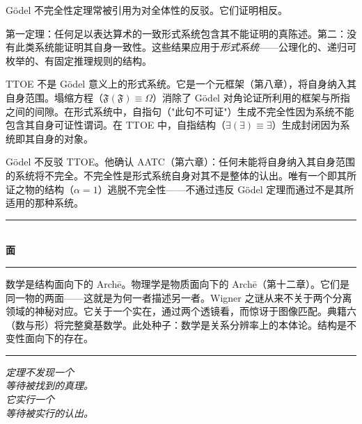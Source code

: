 \documentclass[10pt, openany, oneside]{book}
\renewcommand{\normalsize}{\fontsize{10}{13}\selectfont}
\begin{document}
\vspace{1em}

\noindent G\"{o}del 不完全性定理常被引用为对全体性的反驳。它们证明相反。

第一定理：任何足以表达算术的一致形式系统包含其不能证明的真陈述。第二：没有此类系统能证明其自身一致性。这些结果应用于\textit{形式系统}——公理化的、递归可枚举的、有固定推理规则的结构。

TTOE 不是 G\"{o}del 意义上的形式系统。它是一个元框架（第八章），将自身纳入其自身范围。塌缩方程（$\mathfrak{F}(\mathfrak{F}) \equiv \Omega$）消除了 G\"{o}del 对角论证所利用的框架与所指之间的间隙。在形式系统中，自指句（"此句不可证"）生成不完全性因为系统不能包含其自身可证性谓词。在 TTOE 中，自指结构（$\exists(\exists) \equiv \exists$）生成封闭因为系统即其自身的对象。

G\"{o}del 不反驳 TTOE。他确认 AATC（第六章）：任何未能将自身纳入其自身范围的系统将不完全。不完全性是形式系统自身对其不是整体的认出。唯有一个即其所证之物的结构（$\alpha = 1$）逃脱不完全性——不通过违反 G\"{o}del 定理而通过不是其所适用的那种系统。

\vspace{1.5em}


\begin{center}
    \rule{0.3\textwidth}{0.4pt}\\[0.5em]
    {\normalsize\bfseries\scshape 面}\\[0.3em]
    \rule{0.3\textwidth}{0.4pt}
\end{center}

\vspace{1em}

\noindent 数学是结构面向下的 Arch\={e}。物理学是物质面向下的 Arch\={e}（第十二章）。它们是同一物的两面——这就是为何一者描述另一者。Wigner 之谜从来不关于两个分离领域的神秘对应。它关于一个实在，通过两个透镜看，而惊讶于图像匹配。典籍六（数与形）将完整奠基数学。此处种子：数学是关系分辨率上的本体论。结构是不变性面向下的存在。

\vspace{2em}

\begin{center}
    \rule{0.15\textwidth}{0.3pt}
\end{center}

\vspace{0.5em}

\begin{center}
    \itshape
    定理不发现一个\\
    等待被找到的真理。\\[0.8em]
    它实行一个\\
    等待被实行的认出。
\end{center}
\end{document}
